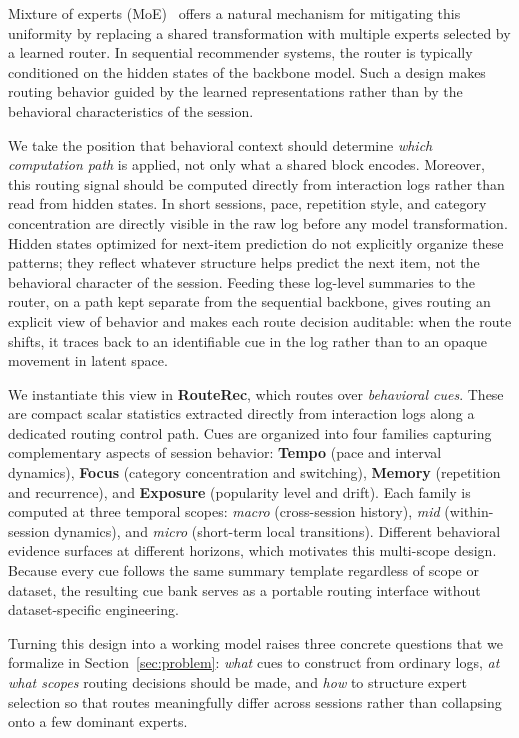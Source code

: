 \documentclass[sigconf,review,anonymous]{acmart}
\begin{document}
Mixture of experts (MoE)~\cite{jacobs1991adaptive,jordan1994hme} offers a natural mechanism for mitigating this uniformity by replacing a shared transformation with multiple experts selected by a learned router.
In sequential recommender systems, the router is typically conditioned on the hidden states of the backbone model.
Such a design makes routing behavior guided by the learned representations rather than by the behavioral characteristics of the session.

We take the position that behavioral context should determine \emph{which computation path} is applied, not only what a shared block encodes. Moreover, this routing signal should be computed directly from interaction logs rather than read from hidden states. In short sessions, pace, repetition style, and category concentration are directly visible in the raw log before any model transformation. Hidden states optimized for next-item prediction do not explicitly organize these patterns; they reflect whatever structure helps predict the next item, not the behavioral character of the session. Feeding these log-level summaries to the router, on a path kept separate from the sequential backbone, gives routing an explicit view of behavior and makes each route decision auditable: when the route shifts, it traces back to an identifiable cue in the log rather than to an opaque movement in latent space.

We instantiate this view in \textbf{RouteRec}, which routes over \emph{behavioral cues}. These are compact scalar statistics extracted directly from interaction logs along a dedicated routing control path. Cues are organized into four families capturing complementary aspects of session behavior: \textbf{Tempo} (pace and interval dynamics), \textbf{Focus} (category concentration and switching), \textbf{Memory} (repetition and recurrence), and \textbf{Exposure} (popularity level and drift). Each family is computed at three temporal scopes: \emph{macro} (cross-session history), \emph{mid} (within-session dynamics), and \emph{micro} (short-term local transitions). Different behavioral evidence surfaces at different horizons, which motivates this multi-scope design. Because every cue follows the same summary template regardless of scope or dataset, the resulting cue bank serves as a portable routing interface without dataset-specific engineering.

Turning this design into a working model raises three concrete questions that we formalize in Section~\ref{sec:problem}: \emph{what} cues to construct from ordinary logs, \emph{at what scopes} routing decisions should be made, and \emph{how} to structure expert selection so that routes meaningfully differ across sessions rather than collapsing onto a few dominant experts.
\end{document}
